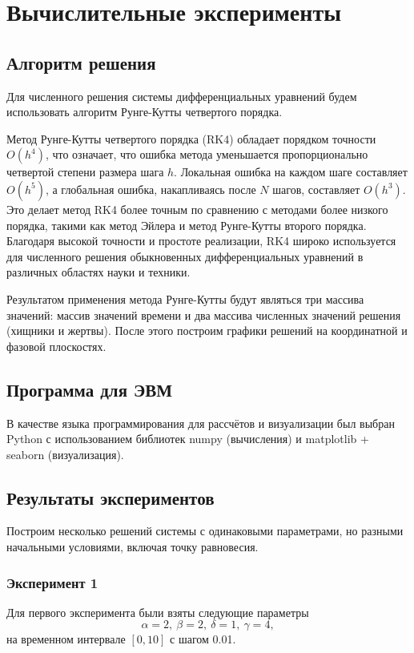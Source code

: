\chapter{Вычислительные эксперименты}
\section{Алгоритм решения}

Для численного решения системы дифференциальных уравнений будем использовать алгоритм Рунге-Кутты \cite{1964calculus} четвертого порядка.

Метод Рунге-Кутты четвертого порядка (RK4) обладает порядком точности \( O(h^4) \), что означает, что ошибка метода уменьшается пропорционально четвертой степени размера шага \( h \). Локальная ошибка на каждом шаге составляет \( O(h^5) \), а глобальная ошибка, накапливаясь после \( N \) шагов, составляет \( O(h^3) \). Это делает метод RK4 более точным по сравнению с методами более низкого порядка, такими как метод Эйлера и метод Рунге-Кутты второго порядка. Благодаря высокой точности и простоте реализации, RK4 широко используется для численного решения обыкновенных дифференциальных уравнений в различных областях науки и техники.

 Результатом применения метода Рунге-Кутты будут являться три массива значений: массив значений времени и два массива численных значений решения (хищники и жертвы). После этого построим графики решений на координатной и фазовой плоскостях.

\section{Программа для ЭВМ}

В качестве языка программирования для рассчётов и визуализации был выбран Python с использованием библиотек numpy (вычисления) и matplotlib + seaborn (визуализация).

 

\section{Результаты экспериментов}
Построим несколько решений системы с одинаковыми параметрами, но разными начальными условиями, включая точку равновесия.
\subsection*{Эксперимент 1}
Для первого эксперимента были взяты следующие параметры $$\alpha = 2, \ \beta = 2, \ \delta = 1, \ \gamma = 4,$$
на временном интервале $[0,10]$ с шагом 0.01.
 
